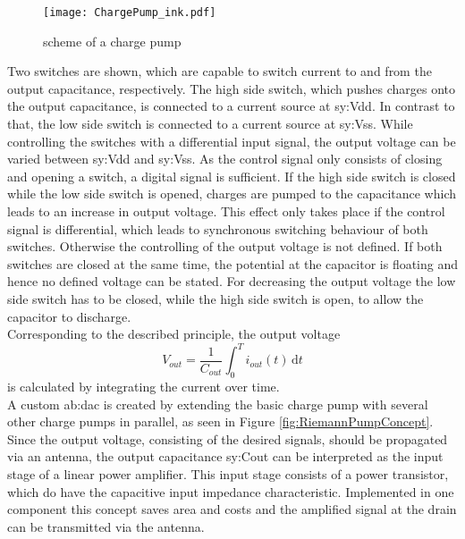 
\begin{figure}[ht]
	\centering
  \texttt{[image: ChargePump\_ink.pdf]}
	\caption{scheme of a charge pump}
	\label{fig:ChargePump}
\end{figure}

Two switches are shown, which are capable to switch current to and from the output capacitance, respectively.
The high side switch, which pushes charges onto the output capacitance, is connected to a current source at \gls{sy:Vdd}.
In contrast to that, the low side switch is connected to a current source at \gls{sy:Vss}.
While controlling the switches with a differential input signal, the output voltage can be varied between \gls{sy:Vdd} and \gls{sy:Vss}.
As the control signal only consists of closing and opening a switch, a digital signal is sufficient.
If the high side switch is closed while the low side switch is opened, charges are pumped to the capacitance which leads to an increase in output voltage.
This effect only takes place if the control signal is differential, which leads to synchronous switching behaviour of both switches.
Otherwise the controlling of the output voltage is not defined.
If both switches are closed at the same time, the potential at the capacitor is floating and hence no defined voltage can be stated.
For decreasing the output voltage the low side switch has to be closed, while the high side switch is open, to allow the capacitor to discharge.\\
Corresponding to the described principle, the output voltage
\begin{equation}
	V_{out} = \frac{1}{C_{out}}{ \int_0^T \! i_{out}(t) \, \mathrm{d}t}
\end{equation} %
 is calculated by integrating the current over time.\\
A custom \gls{ab:dac} is created by extending the basic charge pump with several other charge pumps in parallel, as seen in Figure \ref{fig:RiemannPumpConcept}.
Since the output voltage, consisting of the desired signals, should be propagated via an antenna, the output capacitance \gls{sy:Cout} can be interpreted as the input stage of a linear power amplifier. 
This input stage consists of a power transistor, which do have the capacitive input impedance characteristic.
Implemented in one component this concept saves area and costs and the amplified signal at the drain can be transmitted via the antenna.


